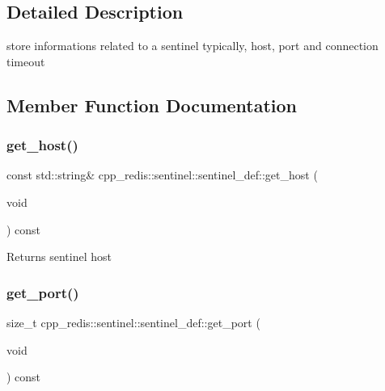 \subsection{Detailed Description}
store informations related to a sentinel typically, host, port and connection timeout 

\subsection{Member Function Documentation}
\mbox{\label{classcpp__redis_1_1sentinel_1_1sentinel__def_af61b33ea2b5154735e4b804039771f19}} 
\subsubsection{\texorpdfstring{get\+\_\+host()}{get\_host()}}
{\footnotesize\ttfamily const std\+::string\& cpp\+\_\+redis\+::sentinel\+::sentinel\+\_\+def\+::get\+\_\+host (\begin{DoxyParamCaption}\item[{void}]{ }\end{DoxyParamCaption}) const\hspace{0.3cm}{\ttfamily [inline]}}

\begin{DoxyReturn}{Returns}
sentinel host 
\end{DoxyReturn}
\mbox{\label{classcpp__redis_1_1sentinel_1_1sentinel__def_a1994bec14cc8703d1198de96b66a0f30}} 
\subsubsection{\texorpdfstring{get\+\_\+port()}{get\_port()}}
{\footnotesize\ttfamily size\+\_\+t cpp\+\_\+redis\+::sentinel\+::sentinel\+\_\+def\+::get\+\_\+port (\begin{DoxyParamCaption}\item[{void}]{ }\end{DoxyParamCaption}) const\hspace{0.3cm}{\ttfamily [inline]}}

